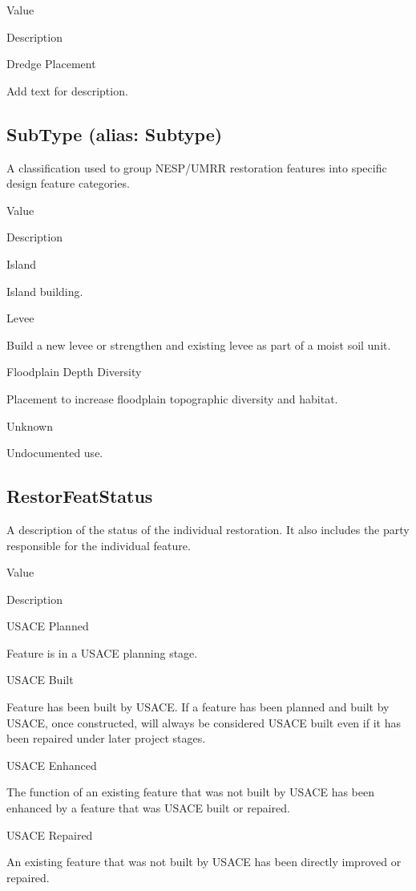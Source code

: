 \documentclass[
  letterpaper,
  DIV=11,
  numbers=noendperiod]{scrreprt}
\begin{document}
Value

Description

Dredge Placement

Add text for description.

\subsection{SubType (alias: Subtype)}\label{subtype-alias-subtype-17}

A classification used to group NESP/UMRR restoration features into
specific design feature categories.

Value

Description

Island

Island building.

Levee

Build a new levee or strengthen and existing levee as part of a moist
soil unit.

Floodplain Depth Diversity

Placement to increase floodplain topographic diversity and habitat.

Unknown

Undocumented use.

\subsection{RestorFeatStatus}\label{restorfeatstatus-17}

A description of the status of the individual restoration. It also
includes the party responsible for the individual feature.

Value

Description

USACE Planned

Feature is in a USACE planning stage.

USACE Built

Feature has been built by USACE. If a feature has been planned and built
by USACE, once constructed, will always be considered USACE built even
if it has been repaired under later project stages.

USACE Enhanced

The function of an existing feature that was not built by USACE has been
enhanced by a feature that was USACE built or repaired.

USACE Repaired

An existing feature that was not built by USACE has been directly
improved or repaired.
\end{document}
